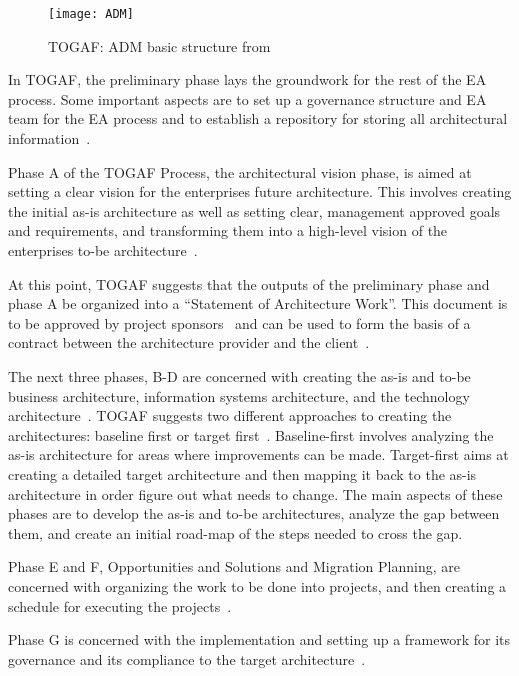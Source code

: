 \begin{figure}
\texttt{[image: ADM]}
\caption{TOGAF: ADM basic structure from \cite[Sec. 5.2.2]{togaf9.1}}
\label{fig:ADM}
\end{figure}

In TOGAF, the preliminary phase lays the groundwork for the rest of the EA process. Some important aspects are to set up a governance structure and EA team for the EA process and to establish a repository for storing all architectural information~\cite[Ch. 6]{togaf9.1}.

Phase A of the TOGAF Process, the architectural vision phase, is aimed at setting a clear vision for the enterprises future architecture. This involves creating the initial as-is architecture as well as setting clear, management approved goals and requirements, and transforming them into a high-level vision of the enterprises to-be architecture~\cite[Ch. 7]{togaf9.1}.

At this point, TOGAF suggests that the outputs of the preliminary phase and phase A be organized into a ``Statement of Architecture Work''. This document is to be approved by project sponsors~\cite[Sec. 7.4.11]{togaf9.1} and can be used to form the basis of a contract between the architecture provider and the client~\cite[Sec. 36.2.20]{togaf9.1}.

The next three phases, B-D are concerned with creating the as-is and to-be business architecture, information systems architecture, and the technology architecture~\cite[Ch.8-12]{togaf9.1}. TOGAF suggests two different approaches to creating the architectures: baseline first or target first~\cite[Ch. 19.4]{togaf9.1}. Baseline-first involves analyzing the as-is architecture for areas where improvements can be made. Target-first aims at creating a detailed target architecture and then mapping it back to the as-is architecture in order figure out what needs to change. The main aspects of these phases are to develop the as-is and to-be architectures, analyze the gap between them, and create an initial road-map of the steps needed to cross the gap.

Phase E and F, Opportunities and Solutions and Migration Planning, are concerned with organizing the work to be done into projects, and then creating a schedule for executing the projects~\cite[Ch. 13-14]{togaf9.1}.

Phase G is concerned with the implementation and setting up a framework for its governance and its compliance to the target architecture~\cite[Ch. 15]{togaf9.1}.


